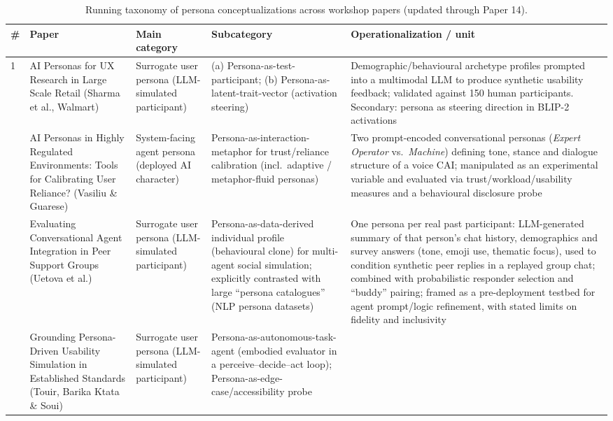 \begin{table}[t]
\centering
\caption{Running taxonomy of persona conceptualizations across workshop papers (updated through Paper 14).}
\label{tab:persona-taxonomy}
\small
\begin{tabular}{p{0.5cm} p{3.6cm} p{3.4cm} p{3.6cm} p{3.6cm}}
\toprule
\textbf{\#} & \textbf{Paper} & \textbf{Main category} & \textbf{Subcategory} & \textbf{Operationalization / unit} \\
\midrule
1 & AI Personas for UX Research in Large Scale Retail (Sharma et al., Walmart) &
Surrogate user persona (LLM-simulated participant) &
(a) Persona-as-test-participant; (b) Persona-as-latent-trait-vector (activation steering) &
Demographic/behavioural archetype profiles prompted into a multimodal LLM to produce synthetic usability feedback; validated against 150 human participants. Secondary: persona as steering direction in BLIP-2 activations \\
\addlinespace
2 & AI Personas in Highly Regulated Environments: Tools for Calibrating User Reliance? (Vasiliu \& Guarese) &
System-facing agent persona (deployed AI character) &
Persona-as-interaction-metaphor for trust/reliance calibration (incl.\ adaptive / metaphor-fluid personas) &
Two prompt-encoded conversational personas (\textit{Expert Operator} vs.\ \textit{Machine}) defining tone, stance and dialogue structure of a voice CAI; manipulated as an experimental variable and evaluated via trust/workload/usability measures and a behavioural disclosure probe \\
\addlinespace
3 & Evaluating Conversational Agent Integration in Peer Support Groups (Uetova et al.) &
Surrogate user persona (LLM-simulated participant) &
Persona-as-data-derived individual profile (behavioural clone) for multi-agent social simulation; explicitly contrasted with large ``persona catalogues'' (NLP persona datasets) &
One persona per real past participant: LLM-generated summary of that person's chat history, demographics and survey answers (tone, emoji use, thematic focus), used to condition synthetic peer replies in a replayed group chat; combined with probabilistic responder selection and ``buddy'' pairing; framed as a pre-deployment testbed for agent prompt/logic refinement, with stated limits on fidelity and inclusivity \\
\addlinespace
4 & Grounding Persona-Driven Usability Simulation in Established Standards (Touir, Barika Ktata \& Soui) &
Surrogate user persona (LLM-simulated participant) &
Persona-as-autonomous-task-agent (embodied evaluator in a perceive--decide--act loop); Persona-as-edge-case/accessibility probe &

\end{tabular}
\end{table}

